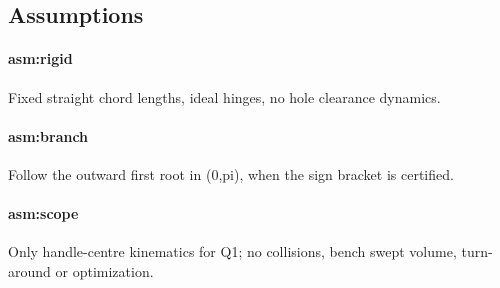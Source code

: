 \subsection*{Assumptions}
\paragraph{asm:rigid} Fixed straight chord lengths, ideal hinges, no hole clearance dynamics.
\paragraph{asm:branch} Follow the outward first root in (0,pi), when the sign bracket is certified.
\paragraph{asm:scope} Only handle-centre kinematics for Q1; no collisions, bench swept volume, turn-around or optimization.
